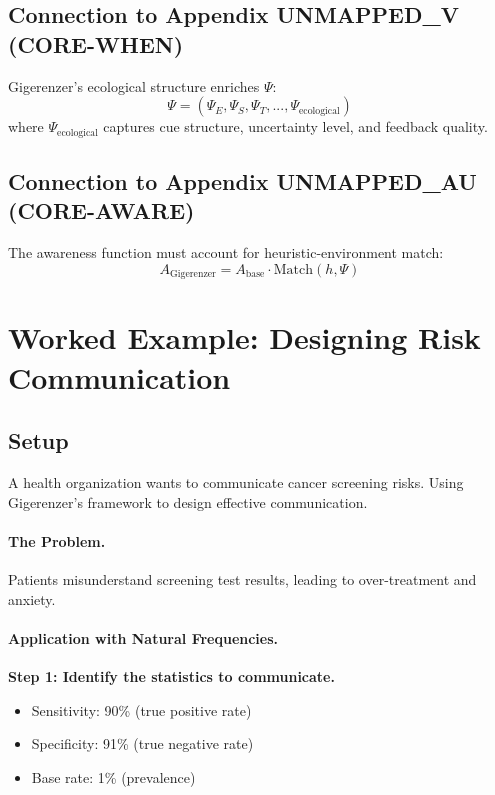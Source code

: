 \subsection{Connection to Appendix UNMAPPED_V (CORE-WHEN)}

Gigerenzer's ecological structure enriches $\Psi$:
\begin{equation}
\Psi = (\Psi_E, \Psi_S, \Psi_T, ..., \Psi_{\text{ecological}})
\end{equation}
where $\Psi_{\text{ecological}}$ captures cue structure, uncertainty level, and feedback quality.

\subsection{Connection to Appendix UNMAPPED_AU (CORE-AWARE)}

The awareness function must account for heuristic-environment match:
\begin{equation}
A_{\text{Gigerenzer}} = A_{\text{base}} \cdot \text{Match}(h, \Psi)
\end{equation}


\section{Worked Example: Designing Risk Communication}
\label{sec:gi-example}

\subsection{Setup}
A health organization wants to communicate cancer screening risks. Using Gigerenzer's framework to design effective communication.

\paragraph{The Problem.} Patients misunderstand screening test results, leading to over-treatment and anxiety.

\paragraph{Application with Natural Frequencies.}

\textbf{Step 1: Identify the statistics to communicate.}
\begin{itemize}[nosep]
\item Sensitivity: 90\% (true positive rate)
\item Specificity: 91\% (true negative rate)
\item Base rate: 1\% (prevalence)
\end{itemize}

